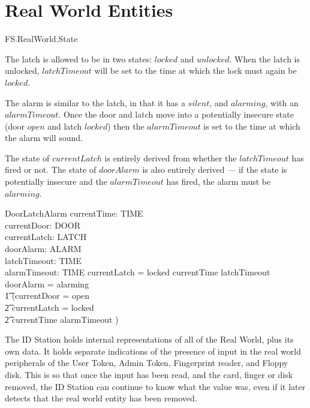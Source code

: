 \section{Real World Entities}

\begin{traceunit}{FS.RealWorld.State}
\end{traceunit}


The latch is allowed to be in two states:
$locked$ and $unlocked$.
When the latch is unlocked,
$latchTimeout$ will be set to the time at which the lock must again be $locked$.


The alarm is similar to the latch, 
in that it has a $silent$, and $alarming$,
with an $alarmTimeout$.
Once the door and latch move into a potentially insecure state
(door $open$ and latch $locked$)
then the $alarmTimeout$ is set to the time at which the alarm will sound.


The state of $currentLatch$ is entirely derived from whether the $latchTimeout$
has fired or not.
The state of $doorAlarm$ is also entirely derived ---
if the state is potentially insecure and the $alarmTimeout$ has fired,
the alarm must be $alarming$.

\begin{schema}{DoorLatchAlarm}
	currentTime: TIME
\\	currentDoor: DOOR
\\	currentLatch: LATCH
\\	doorAlarm: ALARM
\\	latchTimeout: TIME
\\	alarmTimeout: TIME
\where
	currentLatch = locked \iff currentTime \geq latchTimeout
\\	doorAlarm = alarming \iff 
\\ \t1		(currentDoor = open
\\ \t2			\land currentLatch = locked
\\ \t2			\land currentTime \geq alarmTimeout
			)
\end{schema}


The ID Station holds internal representations of all of the Real World,
plus its own data.
It holds separate indications of the presence of input in the real world peripherals
of the User Token, Admin Token, Fingerprint reader, and Floppy disk.
This is so that once the input has been read,
and the card, finger or disk removed,
the ID Station can continue to know what the value was,
even if it later detects that the real world entity has been removed.

